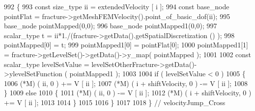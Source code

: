\begin{DoxyCode}
992     \{
993         \textcolor{keyword}{const} size\_type ii = extendedVelocity [ i ];
994         \textcolor{keyword}{const} base\_node pointFlat = fracture->getMeshFEMVelocity().point\_of\_basic\_dof(ii);
995         base\_node pointMapped(0,0);
996         base\_node pointMapped1(0,0);
997     scalar\_type t = ii*1./(fracture->getData().getSpatialDiscretization () );
998         pointMapped[0] = t;
999         pointMapped1[0] = pointFlat[0];
1000         pointMapped1[1] = fracture->getLevelSet()->getData()->y\_map( pointMapped );
1001 
1002     \textcolor{keyword}{const} scalar\_type levelSetValue = levelSetOtherFracture->getData()->ylevelSetFunction ( pointMapped1 );
1003 
1004         \textcolor{keywordflow}{if} ( levelSetValue < 0 )
1005         \{
1006             (*M) ( ii, 0 ) += V [ ii ];
1007             (*M) ( i + shiftVelocity, 0 ) -= V [ ii ];
1008         \}
1009         \textcolor{keywordflow}{else}
1010         \{
1011             (*M) ( ii, 0 ) -= V [ ii ];
1012             (*M) ( i + shiftVelocity, 0 ) += V [ ii ];
1013 
1014         \}
1015 
1016     \}
1017 
1018 \} \textcolor{comment}{// velocityJump\_Cross}
\end{DoxyCode}
